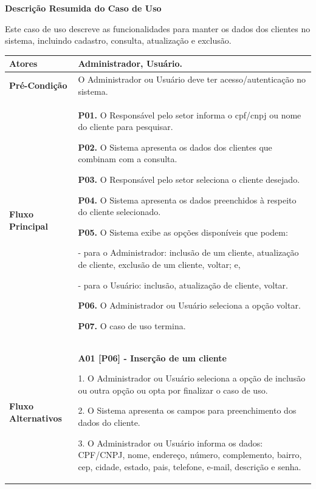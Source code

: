        \textbf {Descrição Resumida do Caso de Uso}        
        
        Este caso de uso descreve as funcionalidades para manter os dados dos clientes no sistema, incluindo cadastro, consulta, atualização e exclusão.
        
\begin{quadro}[!htbp]
	\begin{tabular}{  m{4cm}  m{11cm} }
        \cellcolor{gray!10} \textbf {Atores}                & \cellcolor{gray!10} Administrador, Usuário.  \\ \hline
        \textbf {Pré-Condição}          & O Administrador ou Usuário deve ter acesso/autenticação no sistema.  \\ \hline
       
        \cellcolor{gray!10} \textbf {Fluxo Principal}       & \cellcolor{gray!10} \textbf {P01.} O Responsável pelo setor informa o cpf/cnpj ou nome do cliente para pesquisar.
        
        \textbf {P02.} O Sistema apresenta os dados dos clientes que combinam com a consulta.
        
        \textbf {P03.} O Responsável pelo setor seleciona o cliente desejado.
        
        \textbf {P04.} O Sistema apresenta os dados preenchidos à respeito do cliente selecionado.
        
        \textbf {P05.} O Sistema exibe as opções disponíveis que podem:
        
        - para o Administrador: inclusão de um cliente, atualização de cliente, exclusão de um cliente, voltar; e,
        
        - para o Usuário: inclusão, atualização de cliente, voltar.
        
        \textbf {P06.} O Administrador ou Usuário seleciona a opção voltar.
        
        \textbf {P07.} O caso de uso termina. \\ \hline
		
        \textbf {Fluxo  Alternativos}  & \textbf {A01 [P06] - Inserção de um cliente}
        
        1. O Administrador ou Usuário seleciona a opção de inclusão ou outra opção ou opta por finalizar o caso de uso.
        
        2. O Sistema apresenta os campos para preenchimento dos dados do cliente.
        
        3. O Administrador ou Usuário informa os dados: CPF/CNPJ, nome, endereço, número, complemento, bairro, cep, cidade, estado, pais, telefone, e-mail, descrição e senha.
        

\end{tabular}
\end{quadro}

